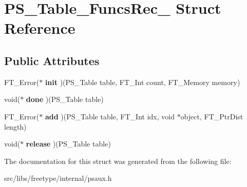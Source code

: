 \hypertarget{struct_p_s___table___funcs_rec__}{
\section{PS\_\-Table\_\-FuncsRec\_\- Struct Reference}
\label{struct_p_s___table___funcs_rec__}
}
\subsection*{Public Attributes}
\begin{DoxyCompactItemize}
\item 
\hypertarget{struct_p_s___table___funcs_rec___ad0e795ae1e8a7040b7ef80d4a46e8d6a}{
FT\_\-Error($\ast$ {\bfseries init} )(PS\_\-Table table, FT\_\-Int count, FT\_\-Memory memory)}
\label{struct_p_s___table___funcs_rec___ad0e795ae1e8a7040b7ef80d4a46e8d6a}

\item 
\hypertarget{struct_p_s___table___funcs_rec___a33d660e1444fbe0ef35a87645f5831ad}{
void($\ast$ {\bfseries done} )(PS\_\-Table table)}
\label{struct_p_s___table___funcs_rec___a33d660e1444fbe0ef35a87645f5831ad}

\item 
\hypertarget{struct_p_s___table___funcs_rec___a38a0e111e48a877f52cce490362e4c91}{
FT\_\-Error($\ast$ {\bfseries add} )(PS\_\-Table table, FT\_\-Int idx, void $\ast$object, FT\_\-PtrDist length)}
\label{struct_p_s___table___funcs_rec___a38a0e111e48a877f52cce490362e4c91}

\item 
\hypertarget{struct_p_s___table___funcs_rec___a252959418225279f78e2ece7fc7705bd}{
void($\ast$ {\bfseries release} )(PS\_\-Table table)}
\label{struct_p_s___table___funcs_rec___a252959418225279f78e2ece7fc7705bd}

\end{DoxyCompactItemize}


The documentation for this struct was generated from the following file:\begin{DoxyCompactItemize}
\item 
src/libs/freetype/internal/psaux.h\end{DoxyCompactItemize}
